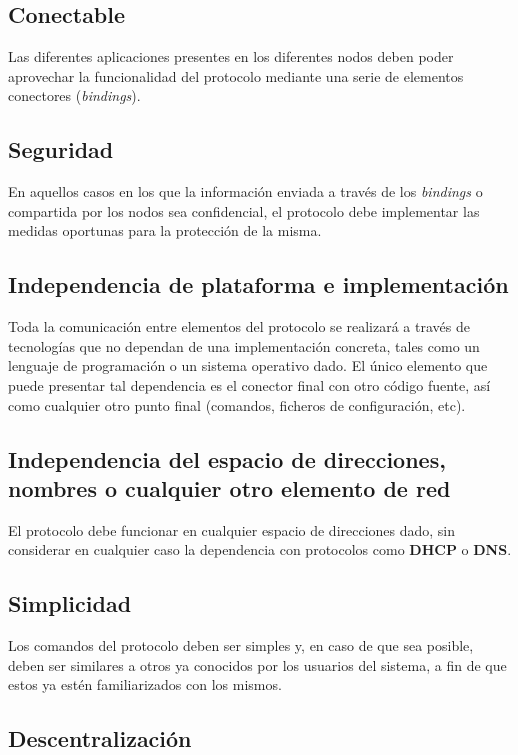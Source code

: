 \documentclass{article}
\begin{document}
\subsection{Conectable}

Las diferentes aplicaciones presentes en los diferentes nodos deben poder aprovechar la funcionalidad del protocolo mediante una serie de elementos conectores (\textit{bindings}).

\subsection{Seguridad}

En aquellos casos en los que la información enviada a través de los \textit{bindings} o compartida por los nodos sea confidencial, el protocolo debe implementar las medidas oportunas para la protección de la misma.

\subsection{Independencia de plataforma e implementación}

Toda la comunicación entre elementos del protocolo se realizará a través de tecnologías que no dependan de una implementación concreta, tales como un lenguaje de programación o un sistema operativo dado. El único elemento que puede presentar tal dependencia es el conector final con otro código fuente, así como cualquier otro punto final (comandos, ficheros de configuración, etc).

\subsection{Independencia del espacio de direcciones, nombres o cualquier otro elemento de red}

El protocolo debe funcionar en cualquier espacio de direcciones dado, sin considerar en cualquier caso la dependencia con protocolos como \textbf{DHCP} o \textbf{DNS}.

\subsection{Simplicidad}

Los comandos del protocolo deben ser simples y, en caso de que sea posible, deben ser similares a otros ya conocidos por los usuarios del sistema, a fin de que estos ya estén familiarizados con los mismos.

\subsection{Descentralización}
\end{document}

